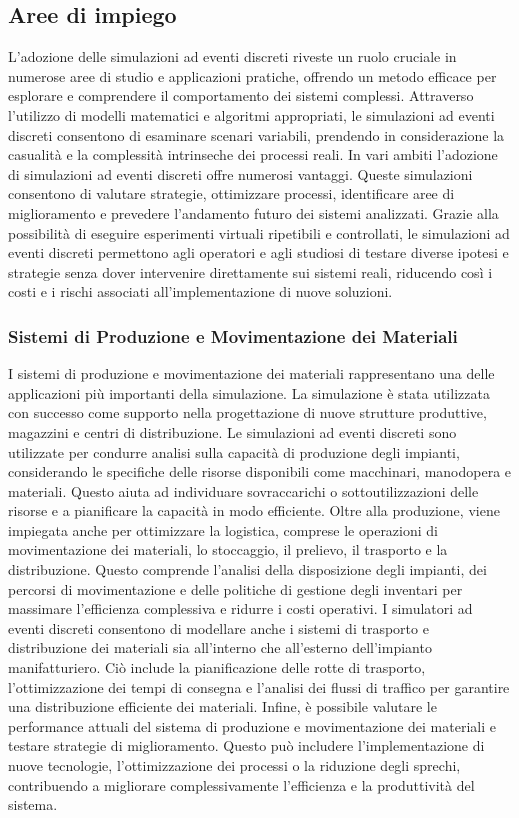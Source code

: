 \documentclass[12pt,a4paper,openright,twoside]{book}
\begin{document}
\subsection{Aree di impiego}
L'adozione delle simulazioni ad eventi discreti riveste un ruolo cruciale in numerose aree di studio e applicazioni pratiche, offrendo un metodo efficace per esplorare e comprendere il comportamento dei sistemi complessi. Attraverso l'utilizzo di modelli matematici e algoritmi appropriati, le simulazioni ad eventi discreti consentono di esaminare scenari variabili, prendendo in considerazione la casualità e la complessità intrinseche dei processi reali.
In vari ambiti l'adozione di simulazioni ad eventi discreti offre numerosi vantaggi. Queste simulazioni consentono di valutare strategie, ottimizzare processi, identificare aree di miglioramento e prevedere l'andamento futuro dei sistemi analizzati. Grazie alla possibilità di eseguire esperimenti virtuali ripetibili e controllati, le simulazioni ad eventi discreti permettono agli operatori e agli studiosi di testare diverse ipotesi e strategie senza dover intervenire direttamente sui sistemi reali, riducendo così i costi e i rischi associati all'implementazione di nuove soluzioni.

\subsubsection{Sistemi di Produzione e Movimentazione dei Materiali}
I sistemi di produzione e movimentazione dei materiali rappresentano una delle applicazioni più importanti della simulazione. La simulazione è stata utilizzata con successo come supporto nella progettazione di nuove strutture produttive, magazzini e centri di distribuzione.
Le simulazioni ad eventi discreti sono utilizzate per condurre analisi sulla capacità di produzione degli impianti, considerando le specifiche delle risorse disponibili come macchinari, manodopera e materiali. Questo aiuta ad individuare sovraccarichi o sottoutilizzazioni delle risorse e a pianificare la capacità in modo efficiente. 
Oltre alla produzione, viene impiegata anche per ottimizzare la logistica, comprese le operazioni di movimentazione dei materiali, lo stoccaggio, il prelievo, il trasporto e la distribuzione. Questo comprende l'analisi della disposizione degli impianti, dei percorsi di movimentazione e delle politiche di gestione degli inventari per massimare l'efficienza complessiva e ridurre i costi operativi. 
I simulatori ad eventi discreti consentono di modellare anche i sistemi di trasporto e distribuzione dei materiali sia all'interno che all'esterno dell'impianto manifatturiero. Ciò include la pianificazione delle rotte di trasporto, l'ottimizzazione dei tempi di consegna e l'analisi dei flussi di traffico per garantire una distribuzione efficiente dei materiali.
Infine, è possibile valutare le performance attuali del sistema di produzione e movimentazione dei materiali e testare strategie di miglioramento. Questo può includere l'implementazione di nuove tecnologie, l'ottimizzazione dei processi o la riduzione degli sprechi, contribuendo a migliorare complessivamente l'efficienza e la produttività del sistema.
\end{document}
